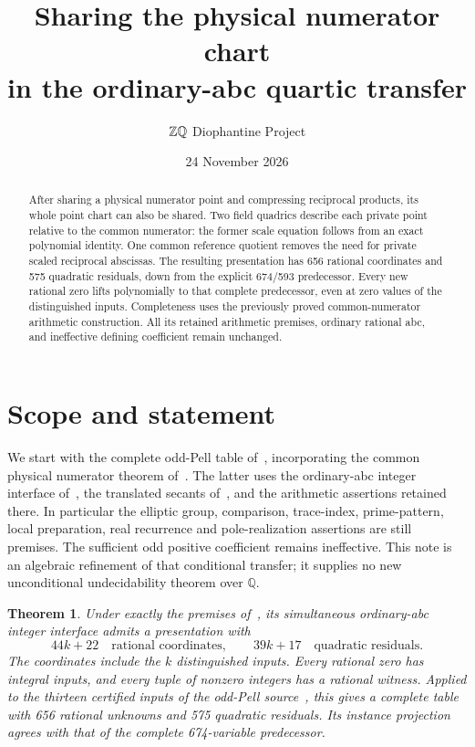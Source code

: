 \documentclass[11pt]{article}
\title{Sharing the physical numerator chart\\in the ordinary-abc quartic transfer}
\author{\(\Z\Q\) Diophantine Project}
\date{24 November 2026}
\newtheorem{theorem}{Theorem}
\newcommand{\Q}{\mathbb Q}\newcommand{\Z}{\mathbb Z}
\begin{document}
\maketitle

\begin{abstract}
After sharing a physical numerator point and compressing reciprocal
products, its whole point chart can also be shared. Two field quadrics
describe each private point relative to the common numerator: the former
scale equation follows from an exact polynomial identity. One common
reference quotient removes the need for private scaled reciprocal
abscissas. The resulting presentation has 656 rational coordinates and
575 quadratic residuals, down from the explicit 674/593 predecessor.
Every new rational zero lifts polynomially to that complete predecessor,
even at zero values of the distinguished inputs. Completeness uses the
previously proved common-numerator arithmetic construction. All its
retained arithmetic premises, ordinary rational abc, and ineffective
defining coefficient remain unchanged.
\end{abstract}

\section{Scope and statement}

We start with the complete odd-Pell table of~\cite{odd}, incorporating
the common physical numerator theorem of~\cite{common}. The latter
uses the ordinary-abc integer interface of~\cite{paired}, the translated
secants of~\cite{secant}, and the arithmetic assertions retained there.
In particular the elliptic group, comparison, trace-index, prime-pattern,
local preparation, real recurrence and pole-realization assertions are
still premises. The sufficient odd positive coefficient remains
ineffective. This note is an algebraic refinement of that conditional
transfer; it supplies no new unconditional undecidability theorem over
\(\Q\).

\begin{theorem}\label{thm:main}
Under exactly the premises of~\cite{common}, its simultaneous ordinary-abc
integer interface admits a presentation with
\[
                44k+22\quad\text{rational coordinates},\qquad
                39k+17\quad\text{quadratic residuals}.
\]
The coordinates include the \(k\) distinguished inputs. Every rational
zero has integral inputs, and every tuple of nonzero integers has a
rational witness. Applied to the thirteen certified inputs of the
odd-Pell source~\cite{odd}, this gives a complete table with 656 rational
unknowns and 575 quadratic residuals. Its instance projection agrees
with that of the complete 674-variable predecessor.
\end{theorem}
\end{document}

